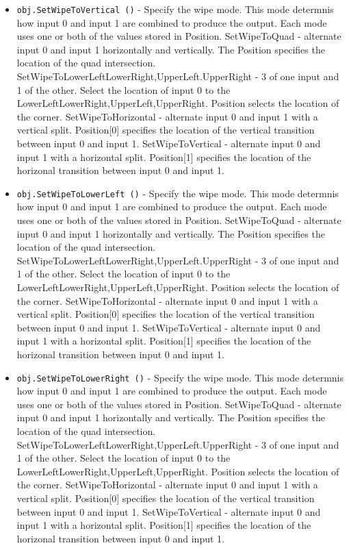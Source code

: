 \begin{itemize}
\item  \verb|obj.SetWipeToVertical ()| -  Specify the wipe mode. This mode determnis how input 0 and input
 1 are combined to produce the output. Each mode uses one or both
 of the values stored in Position.
   SetWipeToQuad - alternate input 0 and input 1 horizontally and
     vertically. The Position specifies the location of the quad
     intersection.
   SetWipeToLowerLeft{LowerRight,UpperLeft.UpperRight} - 3 of one
     input and 1 of the other. Select the location of input 0 to the
     LowerLeft{LowerRight,UpperLeft,UpperRight}. Position
     selects the location of the corner.
   SetWipeToHorizontal - alternate input 0 and input 1 with a vertical
     split. Position[0] specifies the location of the vertical
     transition between input 0 and input 1.
   SetWipeToVertical - alternate input 0 and input 1 with a
     horizontal split. Position[1] specifies the location of the
     horizonal transition between input 0 and input 1.

\item  \verb|obj.SetWipeToLowerLeft ()| -  Specify the wipe mode. This mode determnis how input 0 and input
 1 are combined to produce the output. Each mode uses one or both
 of the values stored in Position.
   SetWipeToQuad - alternate input 0 and input 1 horizontally and
     vertically. The Position specifies the location of the quad
     intersection.
   SetWipeToLowerLeft{LowerRight,UpperLeft.UpperRight} - 3 of one
     input and 1 of the other. Select the location of input 0 to the
     LowerLeft{LowerRight,UpperLeft,UpperRight}. Position
     selects the location of the corner.
   SetWipeToHorizontal - alternate input 0 and input 1 with a vertical
     split. Position[0] specifies the location of the vertical
     transition between input 0 and input 1.
   SetWipeToVertical - alternate input 0 and input 1 with a
     horizontal split. Position[1] specifies the location of the
     horizonal transition between input 0 and input 1.

\item  \verb|obj.SetWipeToLowerRight ()| -  Specify the wipe mode. This mode determnis how input 0 and input
 1 are combined to produce the output. Each mode uses one or both
 of the values stored in Position.
   SetWipeToQuad - alternate input 0 and input 1 horizontally and
     vertically. The Position specifies the location of the quad
     intersection.
   SetWipeToLowerLeft{LowerRight,UpperLeft.UpperRight} - 3 of one
     input and 1 of the other. Select the location of input 0 to the
     LowerLeft{LowerRight,UpperLeft,UpperRight}. Position
     selects the location of the corner.
   SetWipeToHorizontal - alternate input 0 and input 1 with a vertical
     split. Position[0] specifies the location of the vertical
     transition between input 0 and input 1.
   SetWipeToVertical - alternate input 0 and input 1 with a
     horizontal split. Position[1] specifies the location of the
     horizonal transition between input 0 and input 1.


\end{itemize}
